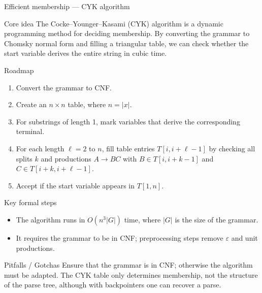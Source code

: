 \begin{frame}[t]{Efficient membership — CYK algorithm}
  \begin{tblock}{Core idea}
    The Cocke–Younger–Kasami (CYK) algorithm is a dynamic programming
    method for deciding membership.  By converting the grammar to
    Chomsky normal form and filling a triangular table, we can check
    whether the start variable derives the entire string in cubic time.
  \end{tblock}
  \begin{tblock}{Roadmap}
    \begin{enumerate}
      \item Convert the grammar to CNF.
      \item Create an $n\times n$ table, where $n = |x|$.
      \item For substrings of length 1, mark variables that derive the
        corresponding terminal.
      \item For each length $\ell = 2$ to $n$, fill table entries
        $T[i,i+\ell-1]$ by checking all splits $k$ and productions
        $A \rightarrow BC$ with $B \in T[i,i+k-1]$ and $C \in
        T[i+k,i+\ell-1]$.
      \item Accept if the start variable appears in $T[1,n]$.
    \end{enumerate}
  \end{tblock}
  \begin{tblock}{Key formal steps}
    \begin{itemize}
      \item The algorithm runs in $O(n^3 |G|)$ time, where $|G|$ is the
        size of the grammar.
      \item It requires the grammar to be in CNF; preprocessing steps
        remove $\varepsilon$ and unit productions.
    \end{itemize}
  \end{tblock}
  \begin{talert}{Pitfalls / Gotchas}
    Ensure that the grammar is in CNF; otherwise the algorithm must be
    adapted.  The CYK table only determines membership, not the
    structure of the parse tree, although with backpointers one can
    recover a parse.
  \end{talert}
  \label{fr:6.3-04}
\end{frame}

